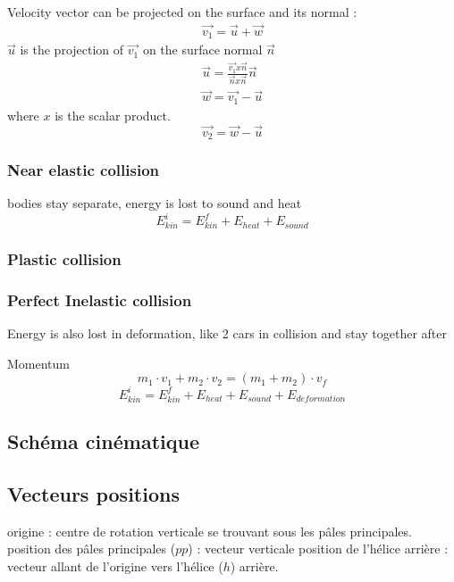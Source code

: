 \documentclass[12pt,a4paper]{article}
\begin{document}
Velocity vector can be projected on the surface and its normal : 
\begin{eqnarray}
	\vec{v_1} = \vec{u} + \vec{w}
\end{eqnarray}
$\vec{u}$ is the projection of $\vec{v_1}$ on the surface normal $\vec{n}$
\begin{eqnarray}
	\vec{u} = \frac{\vec{v_1} x \vec{n}}{\vec{n} x \vec{n}} \vec{n}\\
	\vec{w} = \vec{v_1} - \vec{u}
\end{eqnarray}
where $x$ is the scalar product. 
\begin{equation}
	\vec{v_2} = \vec{w} - \vec{u}
\end{equation}
\subsubsection{Near elastic collision}
bodies stay separate, energy is lost to sound and heat
\begin{equation}
	E_{kin}^i = E_{kin}^f + E_{heat} + E_{sound}
\end{equation}
\subsubsection{Plastic collision}
\subsubsection{Perfect Inelastic collision}
Energy is also lost in deformation, like 
2 cars in collision and stay together after 

Momentum
\begin{equation}
	m_1 \cdot v_1 + m_2 \cdot v_2 = (m_1 + m_2) \cdot v_f
\end{equation}
\begin{equation}
	E_{kin}^i = E_{kin}^f + E_{heat} + E_{sound} + E_{deformation}
\end{equation}
\newpage
\subsection{Schéma cinématique}


\subsection{Vecteurs positions}
origine : centre de rotation verticale se trouvant sous les pâles principales.
\medbreak
position  des pâles principales ($pp$) : vecteur verticale
\medbreak
position de l'hélice arrière : 
vecteur allant de l'origine vers l'hélice ($h$) arrière. 
\end{document}
